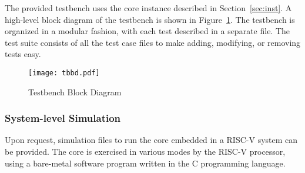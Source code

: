 %

The provided testbench uses the core instance described in
Section~\ref{sec:inst}. A high-level block diagram of the testbench is shown in
Figure~\ref{fig:tbbd}. The testbench is organized in a modular fashion, with
each test described in a separate file. The test suite consists of all the test
case files to make adding, modifying, or removing tests easy.

\begin{figure}[!htbp]
    \centerline{\texttt{[image: tbbd.pdf]}}
    \vspace{0cm}\caption{Testbench Block Diagram}
    \label{fig:tbbd}
\end{figure}



\subsubsection*{System-level Simulation}

Upon request, simulation files to run the core embedded in a RISC-V system can
be provided. The core is exercised in various modes by the RISC-V processor,
using a bare-metal software program written in the C programming language.
